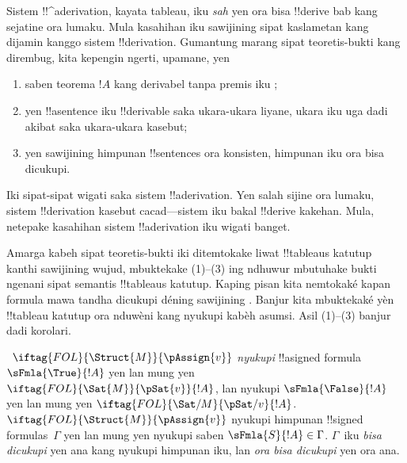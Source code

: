 \documentclass[../../../include/open-logic-section]{subfiles}
\begin{document}
      {}
      {}
      

\begin{explain}
Sistem !!^a{derivation}, kayata tableau, iku \emph{sah} yen ora bisa
!!{derive} bab kang sejatine ora lumaku. Mula kasahihan iku sawijining
sipat kaslametan kang dijamin kanggo sistem !!{derivation}. Gumantung marang
sipat teoretis-bukti kang dirembug, kita kepengin ngerti, upamane, yen
\begin{enumerate}
\item saben teorema $!A$ kang derivabel tanpa premis iku ;
\item yen !!a{sentence} iku !!{derivable} saka ukara-ukara liyane,
  ukara iku uga dadi akibat saka ukara-ukara kasebut;
\item yen sawijining himpunan !!{sentence}s ora konsisten, himpunan
  iku ora bisa dicukupi.
\end{enumerate}
Iki sipat-sipat wigati saka sistem !!a{derivation}. Yen salah sijine
ora lumaku, sistem !!{derivation} kasebut cacad---sistem iku bakal
!!{derive} kakehan. Mula, netepake kasahihan sistem !!a{derivation}
iku wigati banget.

Amarga kabeh sipat teoretis-bukti iki ditemtokake liwat !!{tableau}s
katutup kanthi sawijining wujud, mbuktekake (1)--(3) ing ndhuwur
mbutuhake bukti ngenani sipat semantis !!{tableau}s katutup. Kaping
pisan kita nemtokaké kapan formula mawa tandha dicukupi déning sawijining
. Banjur kita mbuktekaké yèn
!!{tableau} katutup ora nduwèni  kang
nyukupi kabèh asumsi. Asil (1)--(3) banjur dadi korolari.
\end{explain}

\begin{defn}
~$\iftag{FOL}{\Struct{M}}{\pAssign{v}}$
\emph{nyukupi} !!a{signed formula} $\sFmla{\True}{!A}$ yen lan mung
yen $\iftag{FOL}{\Sat{M}}{\pSat{v}}{!A}$, lan nyukupi
$\sFmla{\False}{!A}$ yen lan mung yen
$\iftag{FOL}{\Sat/{M}}{\pSat/{v}}{!A}$. $\iftag{FOL}{\Struct{M}}{\pAssign{v}}$
nyukupi himpunan !!{signed formula}s~$\Gamma$ yen lan mung yen nyukupi
saben $\sFmla{S}{!A} \in \Gamma$. $\Gamma$~iku \emph{bisa dicukupi}
yen ana  kang nyukupi
himpunan iku, lan \emph{ora bisa dicukupi} yen ora ana.
\end{defn}
\end{document}
